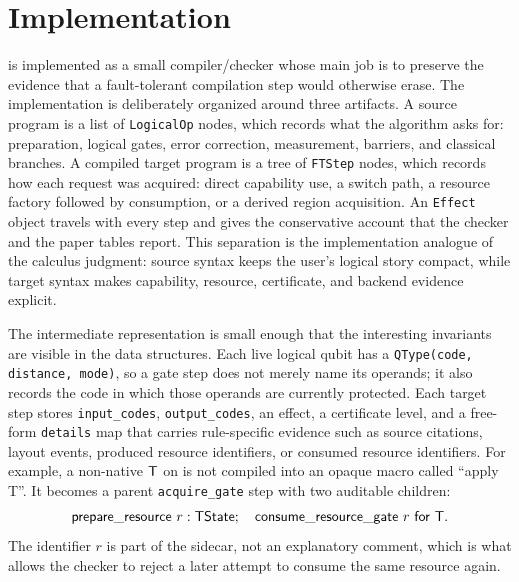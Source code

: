 \section{Implementation}

\lang is implemented as a small compiler/checker whose main job is to preserve the evidence that a fault-tolerant compilation step would otherwise erase.
The implementation is deliberately organized around three artifacts.
A source program is a list of \texttt{LogicalOp} nodes, which records what the algorithm asks for: preparation, logical gates, error correction, measurement, barriers, and classical branches.
A compiled target program is a tree of \texttt{FTStep} nodes, which records how each request was acquired: direct capability use, a switch path, a resource factory followed by consumption, or a derived region acquisition.
An \texttt{Effect} object travels with every step and gives the conservative account that the checker and the paper tables report.
This separation is the implementation analogue of the calculus judgment: source syntax keeps the user's logical story compact, while target syntax makes capability, resource, certificate, and backend evidence explicit.

The intermediate representation is small enough that the interesting invariants are visible in the data structures.
Each live logical qubit has a \texttt{QType(code, distance, mode)}, so a gate step does not merely name its operands; it also records the code in which those operands are currently protected.
Each target step stores \texttt{input\_codes}, \texttt{output\_codes}, an effect, a certificate level, and a free-form \texttt{details} map that carries rule-specific evidence such as source citations, layout events, produced resource identifiers, or consumed resource identifiers.
For example, a non-native $\mathsf{T}$ on  is not compiled into an opaque macro called ``apply T''.
It becomes a parent \texttt{acquire\_gate} step with two auditable children:
\[
  \mathsf{prepare\_resource}\ r:\mathsf{TState};
  \quad
  \mathsf{consume\_resource\_gate}\ r\ \mathsf{for}\ \mathsf{T}.
\]
The identifier $r$ is part of the sidecar, not an explanatory comment, which is what allows the checker to reject a later attempt to consume the same resource again.

